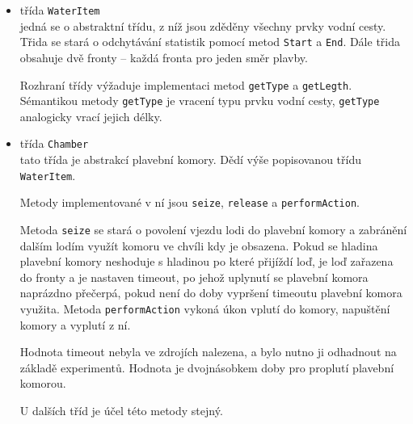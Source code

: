 \documentclass[11pt,a4paper]{article}
\begin{document}
      \begin{itemize}
        \item třída \texttt{WaterItem} \\
              jedná se o abstraktní třídu, z níž jsou zděděny všechny prvky
              vodní cesty. Třida se stará o odchytávání statistik pomocí metod
              \texttt{Start} a \texttt{End}. Dále třida obsahuje dvě fronty 
              -- každá fronta pro jeden směr plavby.

              Rozhraní třídy výžaduje implementaci metod \texttt{getType} a 
              \texttt{getLegth}. Sémantikou metody \texttt{getType} je vracení
              typu prvku vodní cesty, \texttt{getType} analogicky vrací jejich 
              délky.

        \item třída \texttt{Chamber} \\
              tato třída je abstrakcí plavební komory. 
              Dědí výše popisovanou třídu \texttt{WaterItem}.

              Metody implementované v ní jsou \texttt{seize}, \texttt{release}
              a \texttt{performAction}. 

              Metoda \texttt{seize} se stará o povolení vjezdu lodi do plavební
              komory a zabránění dalším lodím využít komoru ve chvíli kdy je
              obsazena. Pokud se hladina plavební komory neshoduje s hladinou
              po které přijíždí loď, je loď zařazena do fronty a je nastaven
              timeout, po jehož uplynutí se plavební komora naprázdno přečerpá,
              pokud není do doby vypršení timeoutu plavební komora využita.
              Metoda \texttt{performAction} vykoná úkon vplutí do komory,
              napuštění komory a vyplutí z ní.

              Hodnota timeout nebyla ve zdrojích nalezena, a bylo nutno ji
              odhadnout na základě experimentů. Hodnota je dvojnásobkem doby
              pro proplutí plavební komorou.

              U dalších tříd je účel této metody stejný.


\end{itemize}
\end{document}
